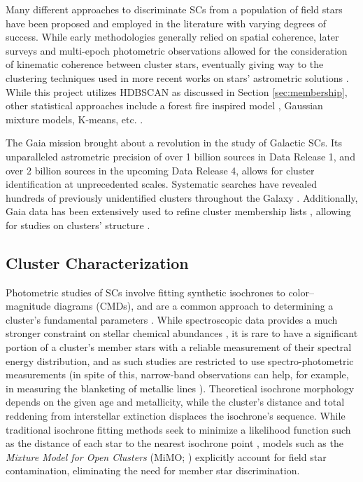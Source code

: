 Many different approaches to discriminate SCs from a population of field stars have been proposed and employed in the literature with varying degrees of success. While early methodologies generally relied on spatial coherence, later surveys and multi-epoch photometric observations allowed for the consideration of kinematic coherence between cluster stars, eventually giving way to the clustering techniques used in more recent works on stars' astrometric solutions \autocite{ramezaniDifferentMethodsCalculate2026}. While this project utilizes HDBSCAN as discussed in Section \ref{sec:membership}, other statistical approaches include a forest fire inspired model \autocite{weiForestFireClustering2025}, Gaussian mixture models, K-means, etc. \autocite{peraPyUPMASKImprovedUnsupervised2021}.

The Gaia mission \autocite{gaiacollaborationGaiaMission2016b} brought about a revolution in the study of Galactic SCs. Its unparalleled astrometric precision of over 1 billion sources in Data Release 1, and over 2 billion sources in the upcoming Data Release 4, allows for cluster identification at unprecedented scales. Systematic searches have revealed hundreds of previously unidentified clusters throughout the Galaxy \autocite{castro-ginardHuntingOpenClusters2022,huntImprovingOpenCluster2021}. Additionally, Gaia data has been extensively used to refine cluster membership lists \autocite{perrenUnifiedClusterCatalogue2023,huntImprovingOpenCluster2024a}, allowing for studies on clusters' structure \autocite{mendesBATEIA1ApproachDetermining2026,tarricqStructuralParameters3892022a}.


\subsection{Cluster Characterization}

Photometric studies of SCs involve fitting synthetic isochrones to color--magnitude diagrams (CMDs), and are a common approach to determining a cluster's fundamental parameters \autocite{diasUpdatedParameters17432021}. While spectroscopic data provides a much stronger constraint on stellar chemical abundances \autocite{kosGALAHSurveyImproving2025}, it is rare to have a significant portion of a cluster's member stars with a reliable measurement of their spectral energy distribution, and as such studies are restricted to use spectro-photometric measurements (in spite of this, narrow-band observations can help, for example, in measuring the blanketing of metallic lines \autocite{paunzenCalibrationGaiaDR32026}). Theoretical isochrone morphology depends on the given age and metallicity, while the cluster's distance and total reddening from interstellar extinction displaces the isochrone's sequence. While traditional isochrone fitting methods seek to minimize a likelihood function such as the distance of each star to the nearest isochrone point \autocite{monteiroFittingIsochronesOpen2010}, models such as the \textit{Mixture Model for Open Clusters} (MiMO; \cite{liMiMOCatalogPhysical2025}) explicitly account for field star contamination, eliminating the need for member star discrimination.

